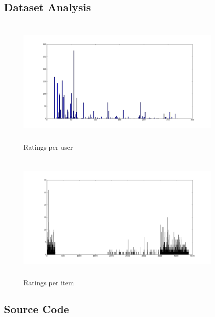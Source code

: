\documentclass{article}
\begin{document}
\subsection{Dataset Analysis}

\begin{figure}[H]
\centering
\includegraphics[height=2.5in, width=4in]{ratingsperuser.png}
\caption{Ratings per user}
\label{ruser}
\end{figure}

\begin{figure}[H]
\centering
\includegraphics[height=2.5in, width=4in]{ratungspermovie.png}
\caption{Ratings per item}
\label{ritem}
\end{figure}




\subsection{Source Code}
\end{document}
